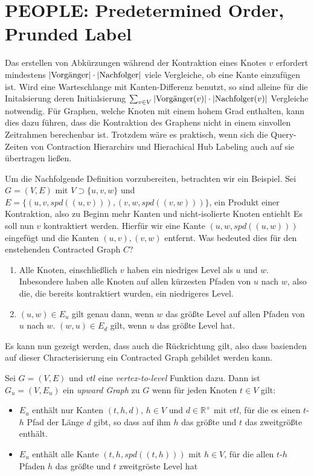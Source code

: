 \chapter{PEOPLE: Predetermined Order, Prunded Label}\label{chapter:peopel}

Das erstellen von Abkürzungen während der Kontraktion eines Knotes $v$ erfordert mindestens $\abs{\text{Vorgänger}} \cdot \abs{\text{Nachfolger}}$ viele Vergleiche, ob eine Kante einzufügen ist.
Wird eine Warteschlange mit Kanten-Differenz benutzt, so sind alleine für die Initalsierung deren Initialsierung $\sum_{v \in V} \abs{\text{Vorgänger}(v)} \cdot \abs{\text{Nachfolger}(v)}$ Vergleiche notwendig.
Für Graphen, welche Knoten mit einem hohem Grad enthalten, kann dies dazu führen, dass die Kontraktion des Graphens nicht in einem sinvollen Zeitrahmen berechenbar ist.
Trotzdem wäre es praktisch, wenn sich die Query-Zeiten von Contraction Hierarchirs und Hierachical Hub Labeling auch auf sie übertragen ließen.

Um die Nachfolgende Definition vorzubereiten, betrachten wir ein Beispiel.
Sei $G = (V, E)$ mit $V \supset \{ u, v, w \}$ und $E = \{ (u, v, {spd}((u, v))), (v, w, {spd}((v, w))) \}$, ein Produkt einer Kontraktion, also zu Beginn mehr Kanten und nicht-isolierte Knoten entiehlt
Es soll nun $v$ kontraktiert werden.
Hierfür wir eine Kante $(u, w, {spd}((u, w)))$ eingefügt und die Kanten $(u, v), (v, w)$ entfernt.
Was bedeuted dies für den enstehenden Contracted Graph $C$?
\begin{enumerate}
  \item
    Alle Knoten, einschließlich $v$ haben ein niedriges Level als $u$ und $w$.
    Inbesondere haben alle Knoten auf allen kürzesten Pfaden von $u$ nach $w$, also die, die bereits kontraktiert wurden, ein niedrigeres Level.

  \item
    $(u, w) \in E_u$ gilt genau dann, wenn $w$ das größte Level auf allen Pfaden von $u$ nach $w$.
    $(w, u) \in E_d$ gilt, wenn $u$ das größte Level hat.
\end{enumerate}

Es kann nun gezeigt werden, dass auch die Rückrichtung gilt, also dass basienden auf dieser Chracterisierung ein Contracted Graph gebildet werden kann.

\begin{definition}\label{people:def:upward_graph}
  Sei $G = (V, E)$ und ${vtl}$ eine \emph{vertex-to-level} Funktion dazu. Dann ist $G_u = (V, E_u)$ ein \emph{upward Graph} zu $G$ wenn für jeden Knoten $t \in V$ gilt:

  \begin{itemize}
    \item
      $E_u$ enthält nur Kanten $(t, h, d)$, $h \in V$ und $d \in \mathbb{R}^+$ mit ${vtl}$, für die es einen $t$-$h$ Pfad der Länge $d$ gibt, so dass auf ihm $h$ das größte und $t$ das zweitgrößte enthält.

    \item
      $E_u$ enthält alle Kante $(t, h, {spd}((t, h)))$ mit $h \in V$, für die allen $t$-$h$ Pfaden $h$ das größte und $t$ zweitgröste Level hat
  \end{itemize}
\end{definition}

